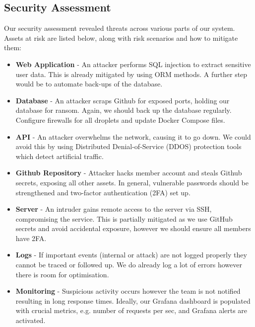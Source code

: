 \subsection{Security Assessment}
Our security assessment revealed threats across various parts of our system. Assets at risk are listed below, along with risk scenarios and how to mitigate them:    
\begin{itemize}
    \item \textbf{Web Application} - An attacker performs SQL injection to extract sensitive user data. This is already mitigated by using ORM methods. A further step would be to automate back-ups of the database.
    
    \item \textbf{Database} - An attacker scraps Github for exposed ports, holding our database for ransom. Again, we should back up the database regularly. Configure firewalls for all droplets and update Docker Compose files.
     
    \item \textbf{API} - An attacker overwhelms the network, causing it to go down. We could avoid this by using Distributed Denial-of-Service (DDOS) protection tools which detect artificial traffic.

    \item \textbf{Github Repository} - Attacker hacks member account and steals Github secrets, exposing all other assets. In general, vulnerable passwords should be strengthened and two-factor authentication (2FA) set up.
    
    \item \textbf{Server} - An intruder gains remote access to the server via SSH, compromising the service. This is partially mitigated as we use GitHub secrets and avoid accidental exposure, however we should ensure all members have 2FA.
    
    \item \textbf{Logs} - If important events (internal or attack) are not logged properly they cannot be traced or followed up. We do already log a lot of errors however there is room for optimisation.

    \item \textbf{Monitoring} - Suspicious activity occurs however the team is not notified resulting in long response times. Ideally, our Grafana dashboard is populated with crucial metrics, e.g. number of requests per sec, and Grafana alerts are activated.


\end{itemize}

